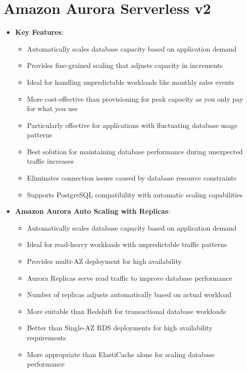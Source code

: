 \documentclass[11pt,a4paper]{report}
\begin{document}
\section{Amazon Aurora Serverless v2}

\begin{itemize}
  \item \textbf{Key Features}:
\begin{itemize}
  \item Automatically scales database capacity based on application demand
  \item Provides fine-grained scaling that adjusts capacity in increments
  \item Ideal for handling unpredictable workloads like monthly sales events
  \item More cost-effective than provisioning for peak capacity as you only pay for what you use
  \item Particularly effective for applications with fluctuating database usage patterns
  \item Best solution for maintaining database performance during unexpected traffic increases
  \item Eliminates connection issues caused by database resource constraints
  \item Supports PostgreSQL compatibility with automatic scaling capabilities
\end{itemize}
\end{itemize}

\begin{itemize}
  \item \textbf{Amazon Aurora Auto Scaling with Replicas}:
\begin{itemize}
  \item Automatically scales database capacity based on application demand
  \item Ideal for read-heavy workloads with unpredictable traffic patterns
  \item Provides multi-AZ deployment for high availability
  \item Aurora Replicas serve read traffic to improve database performance
  \item Number of replicas adjusts automatically based on actual workload
  \item More suitable than Redshift for transactional database workloads
  \item Better than Single-AZ RDS deployments for high availability requirements
  \item More appropriate than ElastiCache alone for scaling database performance
\end{itemize}
\end{itemize}
\end{document}

